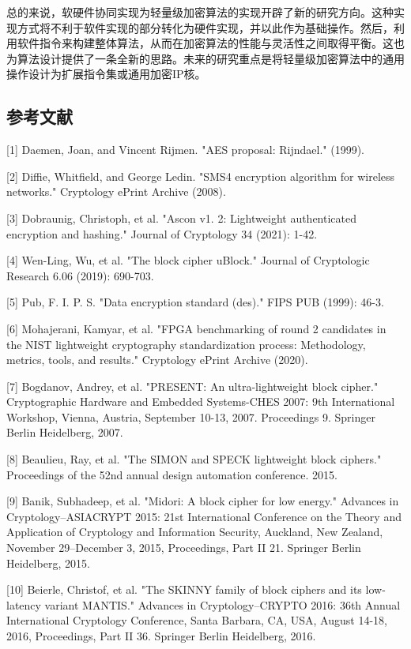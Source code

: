 \documentclass{ctexart}
\begin{document}
总的来说，软硬件协同实现为轻量级加密算法的实现开辟了新的研究方向。这种实现方式将不利于软件实现的部分转化为硬件实现，并以此作为基础操作。然后，利用软件指令来构建整体算法，从而在加密算法的性能与灵活性之间取得平衡。这也为算法设计提供了一条全新的思路。未来的研究重点是将轻量级加密算法中的通用操作设计为扩展指令集或通用加密IP核。


\subsection{参考文献}
[1] Daemen, Joan, and Vincent Rijmen. "AES proposal: Rijndael." (1999).

[2] Diffie, Whitfield, and George Ledin. "SMS4 encryption algorithm for wireless networks." Cryptology ePrint Archive (2008).

[3] Dobraunig, Christoph, et al. "Ascon v1. 2: Lightweight authenticated encryption and hashing." Journal of Cryptology 34 (2021): 1-42.

[4] Wen-Ling, Wu, et al. "The block cipher uBlock." Journal of Cryptologic Research 6.06 (2019): 690-703.

[5] Pub, F. I. P. S. "Data encryption standard (des)." FIPS PUB (1999): 46-3.

[6] Mohajerani, Kamyar, et al. "FPGA benchmarking of round 2 candidates in the NIST lightweight cryptography standardization process: Methodology, metrics, tools, and results." Cryptology ePrint Archive (2020).

[7] Bogdanov, Andrey, et al. "PRESENT: An ultra-lightweight block cipher." Cryptographic Hardware and Embedded Systems-CHES 2007: 9th International Workshop, Vienna, Austria, September 10-13, 2007. Proceedings 9. Springer Berlin Heidelberg, 2007.

[8] Beaulieu, Ray, et al. "The SIMON and SPECK lightweight block ciphers." Proceedings of the 52nd annual design automation conference. 2015.

[9] Banik, Subhadeep, et al. "Midori: A block cipher for low energy." Advances in Cryptology–ASIACRYPT 2015: 21st International Conference on the Theory and Application of Cryptology and Information Security, Auckland, New Zealand, November 29--December 3, 2015, Proceedings, Part II 21. Springer Berlin Heidelberg, 2015.

[10] Beierle, Christof, et al. "The SKINNY family of block ciphers and its low-latency variant MANTIS." Advances in Cryptology–CRYPTO 2016: 36th Annual International Cryptology Conference, Santa Barbara, CA, USA, August 14-18, 2016, Proceedings, Part II 36. Springer Berlin Heidelberg, 2016.
\end{document}
